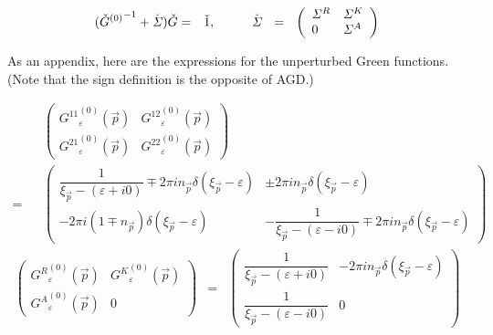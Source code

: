 \documentclass[uplatex,a4j,12pt,dvipdfmx]{jsarticle}
\begin{document}
\begin{eqnarray}
	({{\check{G}}^{(0)}{}}^{-1} + \check{\mathit{\Sigma}} ) \check{G}
	&=&
	\check{1}
	,
	\hspace{10mm}
	\check{\mathit{\Sigma}}
	\ \ = \ \
	\left(
	\begin{array}{ll}
			\mathit{\Sigma}^{R} & \mathit{\Sigma}^{K}
			\\
			0                   & \mathit{\Sigma}^{A}
		\end{array}
	\right)
\end{eqnarray}


As an appendix, here are the expressions for the unperturbed Green functions. (Note that the sign definition is the opposite of AGD.)

\begin{eqnarray}
	&&
	\left(
	\begin{array}{ll}
		{G^{11}{}}^{(0)}_{\varepsilon}(\vec{p}) & {G^{12}{}}^{(0)}_{\varepsilon}(\vec{p})
		\\
		{G^{21}{}}^{(0)}_{\varepsilon}(\vec{p}) & {G^{22}{}}^{(0)}_{\varepsilon}(\vec{p})
	\end{array}\right)
	\\ = &&
	\left(
	\begin{array}{cc}
		\dfrac{1}{\xi_{\vec{p}} - ( \varepsilon + i0 ) } \mp 2 \pi i n_{\vec{p}} \delta( \xi_{\vec{p}} - \varepsilon )
		 &
		\pm 2 \pi i n_{\vec{p}} \delta( \xi_{\vec{p}} - \varepsilon )
		\\
		- 2 \pi i ( 1 \mp n_{\vec{p}} ) \delta( \xi_{\vec{p}} - \varepsilon )
		 &
		- \dfrac{1}{\xi_{\vec{p}} - ( \varepsilon - i0 ) } \mp 2 \pi i n_{\vec{p}} \delta( \xi_{\vec{p}} - \varepsilon )
	\end{array}\right)
\end{eqnarray}
\begin{eqnarray}
	\left(
	\begin{array}{ll}
		{G^{R}{}}^{(0)}_{\varepsilon}(\vec{p}) & {G^{K}{}}^{(0)}_{\varepsilon}(\vec{p})
		\\
		{G^{A}{}}^{(0)}_{\varepsilon}(\vec{p}) & 0
	\end{array}\right)
	&=&
	\left(
	\begin{array}{cc}
		\dfrac{1}{\xi_{\vec{p}} - ( \varepsilon + i0 ) }
		 &
		- 2 \pi i n_{\vec{p}} \delta( \xi_{\vec{p}} - \varepsilon )
		\\
		\dfrac{1}{\xi_{\vec{p}} - ( \varepsilon - i0 )}
		 &
		0
	\end{array}\right)
\end{eqnarray}
\end{document}
